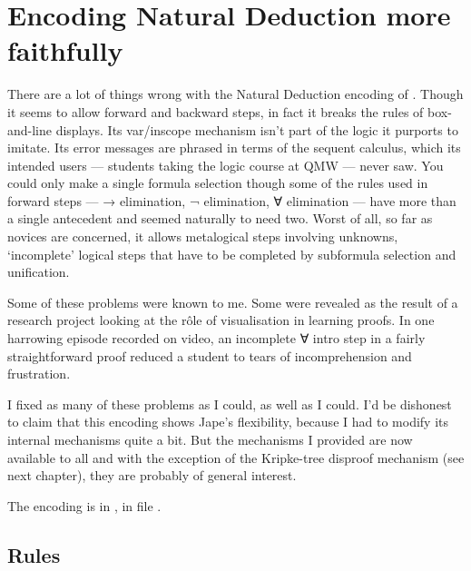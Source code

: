 
\chapter{Encoding Natural Deduction more faithfully}
\label{chap:I2L}

There are a lot of things wrong with the Natural Deduction encoding of . Though it seems to allow forward and backward steps, in fact it breaks the rules of box-and-line displays. Its var/inscope mechanism isn't part of the logic it purports to imitate. Its error messages are phrased in terms of the sequent calculus, which its intended users --- students taking the logic course at QMW --- never saw. You could only make a single formula selection though some of the rules used in forward steps --- → elimination, ¬ elimination, ∀ elimination --- have more than a single antecedent and seemed naturally to need two. Worst of all, so far as novices are concerned, it allows metalogical steps involving unknowns, `incomplete' logical steps that have to be completed by subformula selection and unification.

Some of these problems were known to me. Some were revealed as the result of a research project looking at the r\^{o}le of visualisation in learning proofs. In one harrowing episode recorded on video, an incomplete ∀ intro step in a fairly straightforward proof reduced a student to tears of incomprehension and frustration. 

I fixed as many of these problems as I could, as well as I could. I'd be dishonest to claim that this encoding shows Jape's flexibility, because I had to modify its internal mechanisms quite a bit. But the mechanisms I provided are now available to all and with the exception of the Kripke-tree disproof mechanism (see next chapter), they are probably of general interest.

The encoding is in , in file .

\section{Rules}

